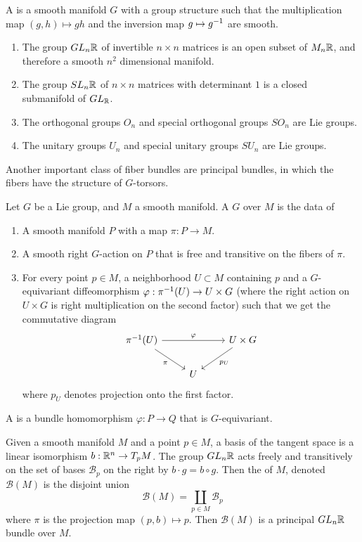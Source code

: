 %
\begin{defn}
A  is a smooth manifold $G$ with a group structure such that the
multiplication map $(g,h) \mapsto gh$ and the inversion map $g \mapsto g^{-1}$
are smooth.
\end{defn}
%
\begin{exmp} \enumbreak
\begin{enumerate}
  \item The group $GL_n\mathbb{R}$ of invertible $n \times n$ matrices is an open
  subset of $M_n\mathbb{R}$, and therefore a smooth $n^2$ dimensional manifold.
  \item The group $SL_n\mathbb{R}$ of $n\times n$ matrices with determinant $1$ is a
  closed submanifold of $GL_{\mathbb{R}}$.
  \item The orthogonal groups $O_n$ and special orthogonal groups $SO_n$ are Lie groups.
  \item The unitary groups $U_n$ and special unitary groups $SU_n$ are Lie groups.
\end{enumerate}
\end{exmp}
%
Another important class of fiber bundles are principal bundles, in which
the fibers have the structure of $G$-torsors.
%
\begin{defn}
Let $G$ be a Lie group, and $M$ a smooth manifold. A  $G$
over $M$ is the data of
%
\begin{enumerate}
  \item A smooth manifold $P$ with a map $\pi : P \to M$.
  \item A smooth right $G$-action on $P$ that is free and transitive on the
  fibers of $\pi$.
  \item For every point $p \in M$, a neighborhood $U \subset M$ containing $p$ and
  a $G$-equivariant diffeomorphism $\varphi: \pi^{-1}(U) \to U \times G$ (where
  the right action on $U \times G$ is right multiplication on the second factor)
  such that we get the commutative diagram
  \[\begin{tikzcd}
  \pi\inv(U) \ar[dr, "\pi"']\ar[rr, "\varphi"]&& U \times G \ar[dl, "p_U"]\\
  & U
  \end{tikzcd}\]
  where $p_U$ denotes projection onto the first factor.
\end{enumerate}
A  is a bundle homomorphism $\varphi : P \to Q$
that is $G$-equivariant.
\end{defn}
%
\begin{exmp}
Given a smooth manifold $M$ and a point $p \in M$, a basis of the
tangent space is a linear isomorphism $b : \mathbb{R}^n \to T_pM$. The group
$GL_n\mathbb{R}$ acts freely and transitively on the set of bases $\mathcal{B}_p$ on the right by
$b \cdot g = b \circ g$. Then the  of $M$, denoted
$\mathcal{B}(M)$ is the disjoint union
\[
\mathcal{B}(M) = \coprod_{p \in M}\mathcal{B}_p
\]
where $\pi$ is the projection map $(p,b) \mapsto p$. Then $\mathcal{B}(M)$
is a principal $GL_n\mathbb{R}$ bundle over $M$.
\end{exmp}
